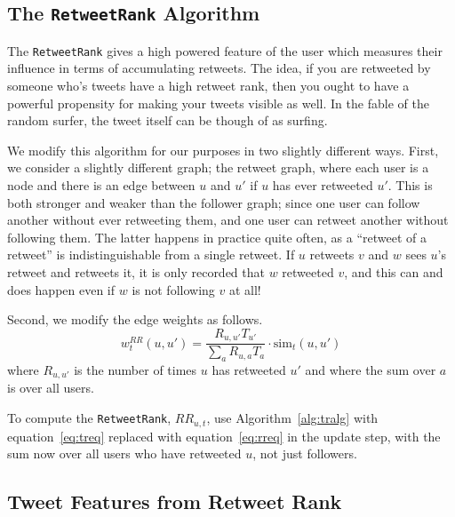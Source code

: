\subsection{The \texttt{RetweetRank} Algorithm}

The \texttt{RetweetRank} gives a high powered feature of the user which measures their influence in terms of accumulating retweets.  
The idea, if you are retweeted by someone who's tweets have a high retweet rank, then you ought to have a powerful propensity for making your tweets visible as well.
In the fable of the random surfer, the tweet itself can be though of as surfing.  

We modify this algorithm for our purposes in two slightly different ways.
First, we consider a slightly different graph; the retweet graph, where each user is a node and there is an edge between $u$ and $u'$ if $u$ has ever retweeted $u'$.
This is both stronger and weaker than the follower graph; since one user can follow another without ever retweeting them, and one user can retweet another without following them.
The latter happens in practice quite often, as a ``retweet of a retweet'' is indistinguishable from a single retweet.
If $u$ retweets $v$ and $w$ sees $u$'s retweet and retweets it, it is only recorded that $w$ retweeted $v$, and this can and does happen even if $w$ is not following $v$ at all!

Second, we modify the edge weights as follows.
\begin{equation}\label{eq:rreq}
w^{RR}_t(u,u') = \frac{R_{u,u'}T_{u'}}{\sum_a R_{u,a}T_{a}}\cdot \mbox{sim}_t(u,u')
\end{equation}
where $R_{u,u'}$ is the number of times $u$ has retweeted $u'$ and where the sum over $a$ is over all users.  

To compute the \texttt{RetweetRank}, $RR_{u,t}$, use Algorithm~\ref{alg:tralg} with equation~\eqref{eq:treq} replaced with equation~\eqref{eq:rreq} in the update step, with the sum now over all users who have retweeted $u$, not just followers.  

\subsection{Tweet Features from Retweet Rank}

